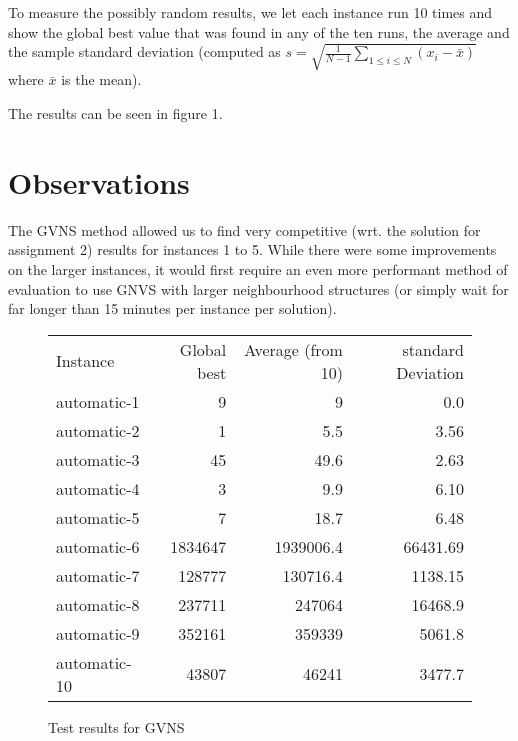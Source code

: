 \documentclass [11pt]{article}
\begin{document}
To measure the possibly random results, we let each instance run 10 times and show the global best value that was found in any of the ten runs, the average and the sample standard deviation (computed as $ s = \sqrt{\frac{1}{N - 1} \sum_{1\leq i \leq N}{(x_i - \bar{x})}}$ where $\bar{x}$ is the mean). 

The results can be seen in figure 1.


\section{Observations}
The GVNS method allowed us to find very competitive (wrt. the solution for assignment 2) results for instances 1 to 5. While there were some improvements on the larger instances, it would first require an even more performant method of evaluation to use GNVS with larger neighbourhood structures (or simply wait for far longer than 15 minutes per instance per solution). 


\newpage

\begin{figure}
  \centering
 \label{fig:results}
  \everyrow{\hline}
  \begin{tabu} {| l |r | r |r |}
  Instance        & Global best   & Average (from 10)   & standard Deviation    \\ 
  automatic-1     & 9             & 9                   & 0.0                   \\ 
  automatic-2     & 1             & 5.5                 & 3.56                  \\ 
  automatic-3     & 45            & 49.6                & 2.63                  \\ 
  automatic-4     & 3             & 9.9                 & 6.10                  \\ 
  automatic-5     & 7             & 18.7                & 6.48                  \\ 
  automatic-6     & 1834647       & 1939006.4           & 66431.69              \\ 
  automatic-7     & 128777        & 130716.4            & 1138.15               \\ 
  automatic-8     & 237711        & 247064              & 16468.9               \\ 
  automatic-9     & 352161        & 359339              & 5061.8                \\ 
  automatic-10    & 43807         & 46241               & 3477.7                \\ 
\end{tabu}
\caption{Test results for GVNS} 
\end{figure}
\end{document}
